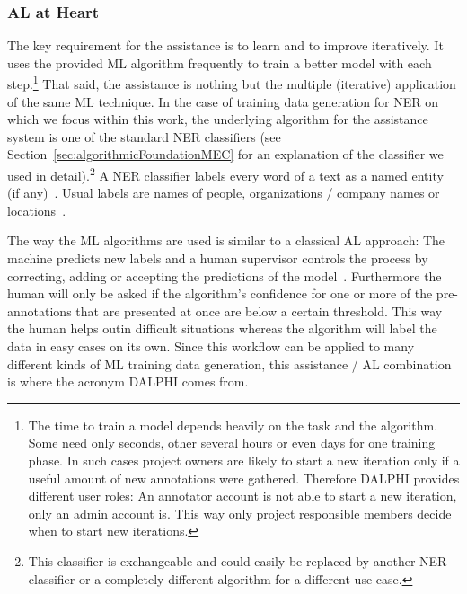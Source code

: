 	\subsubsection{\acl{AL} at Heart}
		\label{sec:conceptionNERatHeart}
		The key requirement for the assistance is to learn and to improve iteratively. It uses the provided \ac{ML} algorithm frequently to train a better model with each step.\footnote{The time to train a model depends heavily on the task and the algorithm. Some need only seconds, other several hours or even days for one training phase. In such cases project owners are likely to start a new iteration only if a useful amount of new annotations were gathered. Therefore \ac{DALPHI} provides different user roles: An annotator account is not able to start a new iteration, only an admin account is. This way only project responsible members decide when to start new iterations.}
		That said, the assistance is nothing but the multiple (iterative) application of the same \ac{ML} technique. In the case of training data generation for \ac{NER} on which we focus within this work, the underlying algorithm for the assistance system is one of the standard \ac{NER} classifiers (see Section~\ref{sec:algorithmicFoundationMEC} for an explanation of the classifier we used in detail).\footnote{This classifier is exchangeable and could easily be replaced by another \ac{NER} classifier or a completely different algorithm for a different use case.}
		A \ac{NER} classifier labels every word of a text as a named entity (if any)~\cite{nadeau2007survey}. Usual labels are names of people, organizations / company names or locations~\cite{tjong2003introduction}.

		The way the \ac{ML} algorithms are used is similar to a classical \acf{AL} approach: The machine predicts new labels and a human supervisor controls the process by correcting, adding or accepting the predictions of the model~\cite{olsson2009literature, settles2010active}. Furthermore the human will only be asked if the algorithm's confidence for one or more of the pre-annotations that are presented at once are below a certain threshold. This way the human \lqq helps out\rqq in difficult situations whereas the algorithm will label the data in easy cases on its own. Since this workflow can be applied to many different kinds of \ac{ML} training data generation, this assistance / \ac{AL} combination is where the acronym \acl{DALPHI} comes from.

